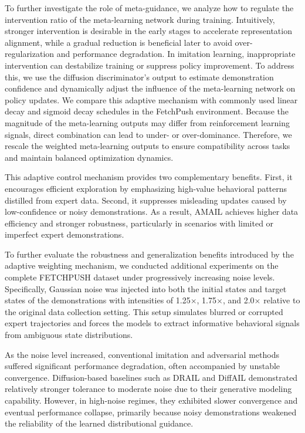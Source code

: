 \documentclass[lettersize,journal]{IEEEtran}
\begin{document}
To further investigate the role of meta-guidance, we analyze how to regulate the intervention ratio of the meta-learning network during training. Intuitively, stronger intervention is desirable in the early stages to accelerate representation alignment, while a gradual reduction is beneficial later to avoid over-regularization and performance degradation. In imitation learning, inappropriate intervention can destabilize training or suppress policy improvement. To address this, we use the diffusion discriminator's output to estimate demonstration confidence and dynamically adjust the influence of the meta-learning network on policy updates. We compare this adaptive mechanism with commonly used linear decay and sigmoid decay schedules in the FetchPush environment. Because the magnitude of the meta-learning outputs may differ from reinforcement learning signals, direct combination can lead to under- or over-dominance. Therefore, we rescale the weighted meta-learning outputs to ensure compatibility across tasks and maintain balanced optimization dynamics.

This adaptive control mechanism provides two complementary benefits. First, it encourages efficient exploration by emphasizing high-value behavioral patterns distilled from expert data. Second, it suppresses misleading updates caused by low-confidence or noisy demonstrations. As a result, AMAIL achieves higher data efficiency and stronger robustness, particularly in scenarios with limited or imperfect expert demonstrations.

To further evaluate the robustness and generalization benefits introduced by the adaptive weighting mechanism, we conducted additional experiments on the complete FETCHPUSH dataset under progressively increasing noise levels. Specifically, Gaussian noise was injected into both the initial states and target states of the demonstrations with intensities of 1.25$\times$, 1.75$\times$, and 2.0$\times$ relative to the original data collection setting. This setup simulates blurred or corrupted expert trajectories and forces the models to extract informative behavioral signals from ambiguous state distributions.

As the noise level increased, conventional imitation and adversarial methods suffered significant performance degradation, often accompanied by unstable convergence. Diffusion-based baselines such as DRAIL and DiffAIL demonstrated relatively stronger tolerance to moderate noise due to their generative modeling capability. However, in high-noise regimes, they exhibited slower convergence and eventual performance collapse, primarily because noisy demonstrations weakened the reliability of the learned distributional guidance.
\end{document}
